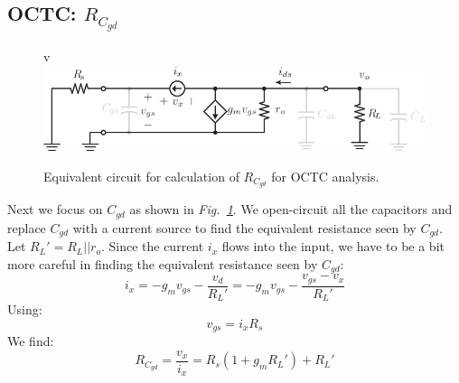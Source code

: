 \subsection{OCTC: \texorpdfstring{$R_{C_{gd}}$}{Equivalent Gate-Drain Capacitor Resistance}}
\begin{figure}[tb]
v\includegraphics[scale=1]{cs_amp_ac_caps_Cgd}
\caption{Equivalent circuit for calculation of $R_{C_{gd}}$ for OCTC analysis.} \label{fig:cs_amp_ac_caps_Cgd}
\end{figure}
Next we focus on $C_{gd}$ as shown in \emph{Fig.~\ref{fig:cs_amp_ac_caps_Cgd}}.  We open-circuit all the capacitors and replace $C_{gd}$ with a current source to find the equivalent resistance seen by $C_{gd}$.  Let $R_L' = R_L || r_o$.  Since the current $i_x$ flows into the input, we have to be a bit more careful in finding the equivalent resistance seen by $C_{gd}$:
    \begin{equation} 
        {i_x} = -{g_m}{v_{gs}} - \frac{{{v_d}}}{{R_L'}} = -{g_m}{v_{gs}} - \frac{{{v_{gs}}-{v_x} }}{{R_L'}} 
    \end{equation}
Using:
    \begin{equation} 
        {v_{gs}} =  {i_x}R_{s} 
    \end{equation}
We find:
    \begin{equation} 
        {R_{C_{gd}}} = \frac{{{v_x}}}{{{i_x}}} = R_{s}(1 + {g_m}R_L') + R_L' 
    \end{equation}
